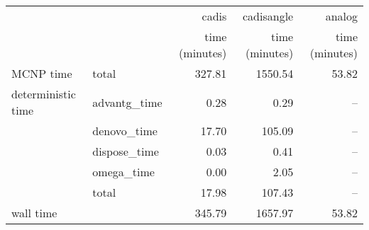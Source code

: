 \begin{tabular}{llrrr}
\toprule
          &              &          cadis &     cadisangle &         analog \\
          &              & time (minutes) & time (minutes) & time (minutes) \\
\midrule
MCNP time & total &         327.81 &        1550.54 &          53.82 \\
deterministic time & advantg\_time &           0.28 &           0.29 &            -- \\
          & denovo\_time &          17.70 &         105.09 &            -- \\
          & dispose\_time &           0.03 &           0.41 &            -- \\
          & omega\_time &           0.00 &           2.05 &            -- \\
          & total &          17.98 &         107.43 &            -- \\
wall time &              &         345.79 &        1657.97 &          53.82 \\
\bottomrule
\end{tabular}
